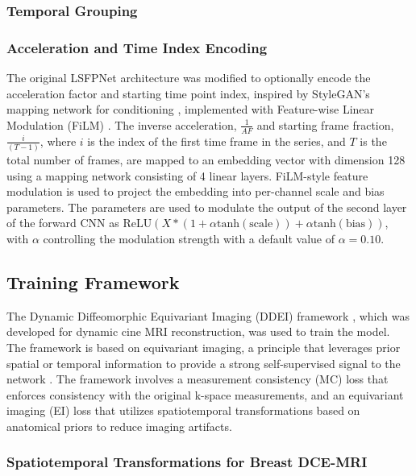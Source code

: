 \documentclass[runningheads]{llncs}
\begin{document}
\subsubsection{Temporal Grouping}


\subsubsection{Acceleration and Time Index Encoding} 

The original LSFPNet architecture was modified to optionally encode the acceleration factor and starting time point index, inspired by StyleGAN's mapping network for conditioning \cite{karras2019stylebasedgeneratorarchitecturegenerative}, implemented with Feature-wise Linear Modulation (FiLM) \cite{perez2017filmvisualreasoninggeneral}. The inverse acceleration, $\frac{1}{AF}$ and starting frame fraction, $\frac{i}{(T-1)}$, where $i$ is the index of the first time frame in the series, and $T$ is the total number of frames, are mapped to an embedding vector with dimension 128 using a mapping network consisting of 4 linear layers. FiLM-style feature modulation is used to project the embedding into per-channel scale and bias parameters. The parameters are used to modulate the output of the second layer of the forward CNN as $\text{ReLU}(X * (1 + \alpha \text{tanh}(\text{scale})) + \alpha \text{tanh}(\text{bias}))$, with $\alpha$ controlling the modulation strength with a default value of $\alpha=0.10$.


\subsection{Training Framework}

The Dynamic Diffeomorphic Equivariant Imaging (DDEI) framework \cite{Wang_2025}, which was developed for dynamic cine MRI reconstruction, was used to train the model. The framework is based on equivariant imaging, a principle that leverages prior spatial or temporal information to provide a strong self-supervised signal to the network \cite{chen2021equivariantimaginglearningrange}. The framework involves a measurement consistency (MC) loss that enforces consistency with the original k-space measurements, and an equivariant imaging (EI) loss that utilizes spatiotemporal transformations based on anatomical priors to reduce imaging artifacts.

\subsubsection{Spatiotemporal Transformations for Breast DCE-MRI}
\end{document}
